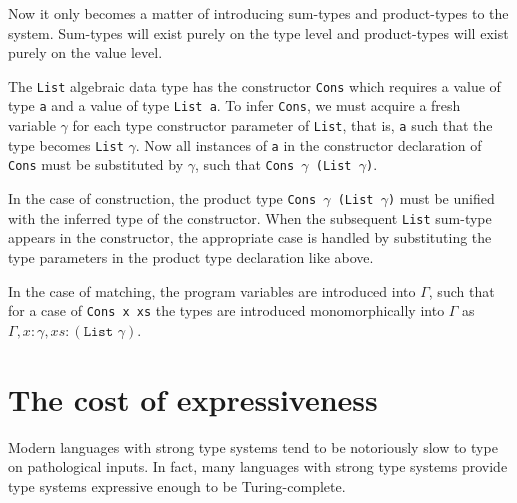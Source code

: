 Now it only becomes a matter of introducing sum-types and product-types to the system.
Sum-types will exist purely on the type level and product-types will exist purely on the value level.


The \texttt{List} algebraic data type has the constructor \texttt{Cons} which requires a value of type \texttt{a} and a value of type \texttt{List a}.
To infer \texttt{Cons}, we must acquire a fresh variable $\gamma$ for each type constructor parameter of \texttt{List}, that is, \texttt{a} such that the type becomes \texttt{List} $\gamma$.
Now all instances of \texttt{a} in the constructor declaration of \texttt{Cons} must be substituted by $\gamma$, such that \texttt{Cons $\gamma$ (List $\gamma$)}.

In the case of construction, the product type \texttt{Cons $\gamma$ (List $\gamma$)} must be unified with the inferred type of the constructor.
When the subsequent \texttt{List} sum-type appears in the constructor, the appropriate case is handled by substituting the type parameters in the product type declaration like above.

In the case of matching, the program variables are introduced into $\Gamma$, such that for a case of \texttt{Cons x xs} the types are introduced monomorphically into $\Gamma$ as $\Gamma,x:\gamma,xs:(\texttt{List } \gamma)$.



\section{The cost of expressiveness}
Modern languages with strong type systems tend to be notoriously slow to type on pathological inputs.
In fact, many languages with strong type systems provide type systems expressive enough to be Turing-complete.

